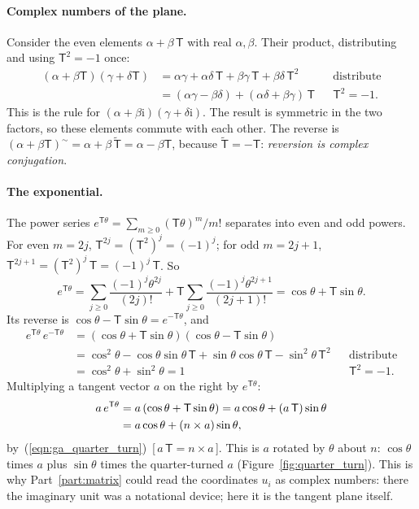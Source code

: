 \paragraph{Complex numbers of the plane.} Consider the even elements $\alpha + \beta\,\mathsf T$ with real $\alpha, \beta$. Their product, distributing and using $\mathsf T^2 = -1$ once:
\begin{align*}
(\alpha + \beta\mathsf T)(\gamma + \delta\mathsf T) &= \alpha\gamma + \alpha\delta\,\mathsf T + \beta\gamma\,\mathsf T + \beta\delta\,\mathsf T^2 && \text{distribute} \\
&= (\alpha\gamma - \beta\delta) + (\alpha\delta + \beta\gamma)\,\mathsf T && \mathsf T^2 = -1 .
\end{align*}
This is the rule for $(\alpha + \beta\mathrm i)(\gamma + \delta\mathrm i)$. The result is symmetric in the two factors, so these elements commute with each other. The reverse is $(\alpha + \beta\mathsf T)^\sim = \alpha + \beta\,\widetilde{\mathsf T} = \alpha - \beta\mathsf T$, because $\widetilde{\mathsf T} = -\mathsf T$: \emph{reversion is complex conjugation}.

\paragraph{The exponential.} The power series $e^{\mathsf T\theta} = \sum_{m\ge 0} (\mathsf T\theta)^m/m!$ separates into even and odd powers. For even $m = 2j$, $\mathsf T^{2j} = (\mathsf T^2)^j = (-1)^j$; for odd $m = 2j + 1$, $\mathsf T^{2j+1} = (\mathsf T^2)^j\,\mathsf T = (-1)^j\,\mathsf T$. So
\begin{equation*}
e^{\mathsf T\theta} = \sum_{j\ge 0} \frac{(-1)^j\theta^{2j}}{(2j)!} + \mathsf T\sum_{j\ge 0} \frac{(-1)^j\theta^{2j+1}}{(2j+1)!} = \cos\theta + \mathsf T\sin\theta .
\end{equation*}
Its reverse is $\cos\theta - \mathsf T\sin\theta = e^{-\mathsf T\theta}$, and
\begin{align*}
e^{\mathsf T\theta}\,e^{-\mathsf T\theta} &= (\cos\theta + \mathsf T\sin\theta)(\cos\theta - \mathsf T\sin\theta) \\
&= \cos^2\theta - \cos\theta\sin\theta\,\mathsf T + \sin\theta\cos\theta\,\mathsf T - \sin^2\theta\,\mathsf T^2 && \text{distribute} \\
&= \cos^2\theta + \sin^2\theta = 1 && \mathsf T^2 = -1 .
\end{align*}
Multiplying a tangent vector $a$ on the right by $e^{\mathsf T\theta}$:
\begin{align}
a\, e^{\mathsf T \theta} &= a\,(\cos\theta + \mathsf T\sin\theta) = a \cos\theta + (a\,\mathsf T) \sin\theta \notag\\
&= a \cos\theta + (n \times a) \sin\theta , \label{eqn:ga_rotation_plane}
\end{align}
by~(\ref{eqn:ga_quarter_turn})~[\,$a\,\mathsf T = n\times a$\,]. This is $a$ rotated by $\theta$ about $n$: $\cos\theta$ times $a$ plus $\sin\theta$ times the quarter-turned $a$ (Figure~\ref{fig:quarter_turn}). This is why Part~\ref{part:matrix} could read the coordinates $u_i$ as complex numbers: there the imaginary unit was a notational device; here it is the tangent plane itself.

